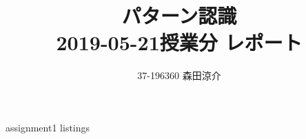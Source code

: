 \documentclass[dvipdfmx, fleqn]{jsarticle}
\title{
    パターン認識 \\
    2019-05-21授業分 レポート
    }
\author{37-196360 \quad 森田涼介}
\begin{document}
\maketitle
{assignment1}
\clearpage
{listings}
\end{document}

